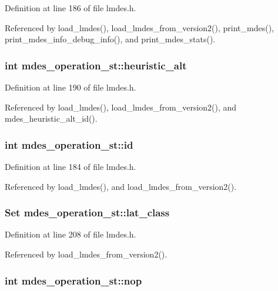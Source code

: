 Definition at line 186 of file lmdes.h.

Referenced by load\_\-lmdes(), load\_\-lmdes\_\-from\_\-version2(), print\_\-mdes(), print\_\-mdes\_\-info\_\-debug\_\-info(), and print\_\-mdes\_\-stats().
\subsubsection{\setlength{\rightskip}{0pt plus 5cm}int \bf{mdes\_\-operation\_\-st::heuristic\_\-alt}}\label{structmdes__operation__st_1adff4df850ed9c1d2007764310ea4d5}




Definition at line 190 of file lmdes.h.

Referenced by load\_\-lmdes(), load\_\-lmdes\_\-from\_\-version2(), and mdes\_\-heuristic\_\-alt\_\-id().
\subsubsection{\setlength{\rightskip}{0pt plus 5cm}int \bf{mdes\_\-operation\_\-st::id}}\label{structmdes__operation__st_6913741860f14acef9661e666ad812f0}




Definition at line 184 of file lmdes.h.

Referenced by load\_\-lmdes(), and load\_\-lmdes\_\-from\_\-version2().
\subsubsection{\setlength{\rightskip}{0pt plus 5cm}\bf{Set} \bf{mdes\_\-operation\_\-st::lat\_\-class}}\label{structmdes__operation__st_b0114c696ce37ad2e8ec297b161cd836}




Definition at line 208 of file lmdes.h.

Referenced by load\_\-lmdes\_\-from\_\-version2().
\subsubsection{\setlength{\rightskip}{0pt plus 5cm}int \bf{mdes\_\-operation\_\-st::nop}}\label{structmdes__operation__st_8becbd2f5cdbcefc1416755e284f575e}




